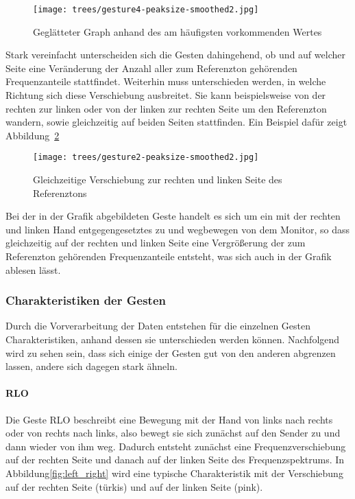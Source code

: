 \begin{figure}[htbp] \centering
\texttt{[image: trees/gesture4-peaksize-smoothed2.jpg]}
\caption{Geglätteter Graph anhand des am häufigsten vorkommenden Wertes}
\label{fig:frequent_value}
\end{figure}


Stark vereinfacht unterscheiden sich die Gesten dahingehend, ob und auf welcher Seite 
eine Veränderung der Anzahl aller zum Referenzton gehörenden Frequenzanteile stattfindet. 
Weiterhin muss unterschieden werden, in welche Richtung sich diese Verschiebung ausbreitet. 
Sie kann beispielsweise von der rechten zur linken oder von der linken zur rechten Seite 
um den Referenzton wandern, sowie gleichzeitig auf beiden Seiten stattfinden. 
Ein Beispiel dafür zeigt Abbildung~\ref{fig:left_right_same_time}

\begin{figure}[htbp] \centering
\texttt{[image: trees/gesture2-peaksize-smoothed2.jpg]}
\caption{Gleichzeitige Verschiebung zur rechten und linken Seite des Referenztons}
\label{fig:left_right_same_time}
\end{figure}

Bei der in der Grafik abgebildeten Geste handelt es sich um ein mit der rechten und linken Hand entgegengesetztes zu und 
wegbewegen von dem Monitor, so dass gleichzeitig auf der rechten und linken Seite eine Vergrößerung der 
zum Referenzton gehörenden Frequenzanteile entsteht, was sich auch in der Grafik ablesen lässt.

\subsubsection{Charakteristiken der Gesten} \label{charakteristiken}
Durch die Vorverarbeitung der Daten entstehen für die einzelnen Gesten Charakteristiken, anhand dessen sie unterschieden werden können. Nachfolgend wird zu sehen sein, dass sich einige der Gesten gut von den anderen abgrenzen lassen, andere sich dagegen stark ähneln.

\paragraph*{\acl{RLO}}
Die Geste \acl{RLO} beschreibt eine Bewegung mit der Hand von links nach rechts oder von rechts nach links, also bewegt sie sich zunächst auf den Sender zu und dann wieder von ihm weg. Dadurch entsteht zunächst eine Frequenzverschiebung auf der rechten Seite und danach auf der linken Seite des Frequenzspektrums. In Abbildung\ref{fig:left_right} wird eine typische Charakteristik mit der Verschiebung auf der rechten Seite (türkis) und auf der linken Seite (pink).

